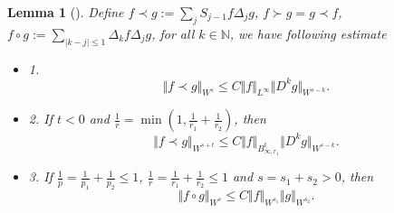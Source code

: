 \documentclass{article}
\newtheorem{lemma}{Lemma}[section]
\numberwithin{equation}{section}
\begin{document}
\begin{lemma}[\cite{bahouri2011fourier}]\label{le;est;paraproduct}\label{le;est;paraproduct;modify}
	Define $f\prec g:=\sum_{j}S_{j-1}f\Delta_jg$, $f\succ g=g\prec f$, $f\circ g:=\sum_{\vert k-j\vert\leq 1}\Delta_k f\Delta_j g$, for all $k\in \mathbb{N}$, we have following estimate
	\begin{itemize}
		\item{1.  $$\Vert f\prec g\Vert_{W^s}\leq C\Vert f\Vert_{L^\infty}\Vert D^k g\Vert_{W^{s-k}}.$$}
		\item{2. If $t<0$ and $\frac{1}{r}=\min(1,\frac{1}{r_1}+\frac{1}{r_2})$, then $$\Vert f\prec g\Vert_{W^{s+t}}\leq C\Vert f\Vert_{B_{\infty,r_1}^t}\Vert D^k g\Vert_{W^{s-k}}.$$}
		\item{3. If $\frac{1}{p}=\frac{1}{p_1}+\frac{1}{p_2}\leq1$, $\frac{1}{r}=\frac{1}{r_1}+\frac{1}{r_2}\leq1$ and $s=s_1+s_2>0$, then
			$$\Vert f\circ g\Vert_{W^{s}}\leq C\Vert f\Vert_{W^{s_1}}\Vert g\Vert_{W^{s_2}}.$$}
	\end{itemize}
\end{lemma}
\end{document}
